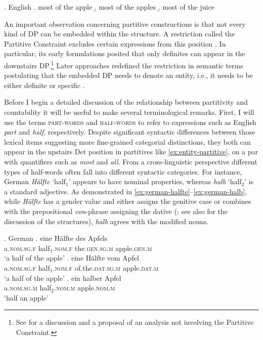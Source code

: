 \ex. English
\a. most of the apple\label{ex:entity-partitive}
\b. most of the apples\label{ex:set-partitive}
\b. most of the juice\label{ex:mass-partitive}

	An important observation concerning partitive constructions is that not every kind of DP can be embedded within the structure. A restriction called the Partitive Constraint excludes certain expressions from this position \citep[e.g.,][]{jackendoff1977x-bar,selkirk1977some,barwise_cooper1981generalized,ladusaw1982semantic}. In particular, its early formulations posited that only definites can appear in the downstairs DP.\footnote{See \citet{abbott1996doing} for a discussion and a proposal of an analysis not involving the Partitive Constraint.} Later approaches redefined the restriction in semantic terms postulating that the embedded DP needs to denote an entity, i.e., it needs to be either definite or specific \citep{de_hoop1997semantic}.

Before I begin a detailed discussion of the relationship between partitivity and countability it will be useful to make several terminological remarks. First, I will use the terms \textsc{part-words} and \textsc{half-words} to refer to expressions such as English \textit{part} and \textit{half}, respectively. Despite significant syntactic differences between those lexical items suggesting more fine-grained categorial distinctions, they both can appear in the upstairs Det position in partitives like \ref{ex:entity-partitive}, on a par with quantifiers such as \textit{most} and \textit{all}. From a cross-linguistic perspective different types of half-words often fall into different syntactic categories. For instance, German \textit{Hälfte} `half$_1$' appears to have nominal properties, whereas \textit{halb} `half$_2$' is a standard adjective. As demonstrated in \ref{ex:german-halfte}--\ref{ex:german-halb}, while \textit{Hälfte} has a gender value and either assigns the genitive case or combines with the prepositional \textit{von}-phrase assigning the dative (\citealt{durrell1996hammers}; see also \citealt{hoeing1997phrase,asbury2007towards} for the discussion of the structures), \textit{halb} agrees with the modified nouns. 

\ex.\label{ex:german-halfte-halb} German
\ag. eine Hälfte des Apfels\label{ex:german-halfte}\\
a\textsc{.nom.sg.f} half$_{1}$\textsc{.nom.f} the\textsc{.gen.sg.m} apple\textsc{.gen.m}\\
`a half of the apple'
\bg. eine Hälfte vom Apfel\label{ex:german-halfte-von}\\
a\textsc{.nom.sg.f} half$_{1}$\textsc{.nom.f} of.the\textsc{.dat.sg.m} apple\textsc{.dat.m}\\
`a half of the apple'
\bg. ein halber Apfel\label{ex:german-halb}\\
a\textsc{.nom.sg.m} half$_{2}$\textsc{.nom.m} apple\textsc{.nom.m}\\
`half an apple'

